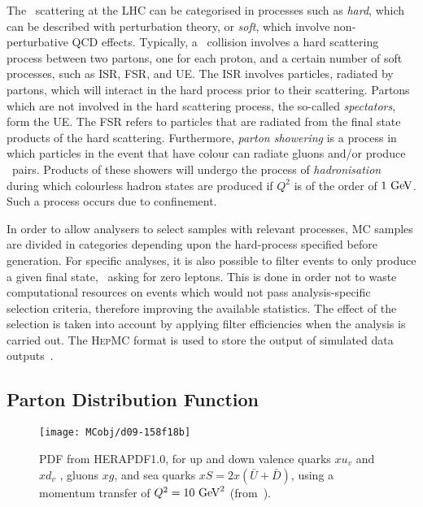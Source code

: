 		The \pp\ scattering at the \ac{LHC} can be categorised in processes such as \emph{hard}, which can be described with perturbation theory, or \emph{soft}, which involve non-perturbative \ac{QCD} effects. Typically, a \pp\ collision involves a hard scattering process between two partons, one for each proton, and a certain number of soft processes, such as \ac{ISR}, \ac{FSR}, and \ac{UE}. The \ac{ISR} involves particles, radiated by partons, which will interact in the hard process prior to their scattering. Partons which are not involved in the hard scattering process, the so-called \emph{spectators}, form the \ac{UE}. The \ac{FSR} refers to particles that are radiated from the final state products of the hard scattering. Furthermore, \emph{parton showering} is a process in which particles in the event that have colour can radiate gluons and/or produce \qqbar\ pairs. Products of these showers will undergo the process of \emph{hadronisation} during which colourless hadron states are produced if $Q^2$ is of the order of $1 \GeV$. Such a process occurs due to confinement. 

		In order to allow analysers to select samples with relevant processes, \ac{MC} samples are divided in categories depending upon the hard-process specified before generation. For specific analyses, it is also possible to filter events to only produce a given final state, \eg\ asking for zero leptons. This is done in order not to waste computational resources on events which would not pass analysis-specific selection criteria, therefore improving the available statistics. The effect of the selection is taken into account by applying filter efficiencies when the analysis is carried out. The \textsc{HepMC} format is used to store the output of simulated data outputs~\cite{DOBBS200141}.
		

		\subsection*{Parton Distribution Function}

			\begin{wrapfigure}{L}{.5\textwidth}
				\centering
				\texttt{[image: MCobj/d09-158f18b]}
				\caption{\label{fig:HERAPDF} PDF from \textsc{HERAPDF1.0}, for up and down valence quarks $xu_v$ and $xd_v$ , gluons $xg$, and sea quarks $xS = 2x(\bar{U} + \bar{D})$, using a momentum transfer of $Q^2 =10 \GeV^2$ (from~\cite{Aaron:2009aa}).}
			\end{wrapfigure}

